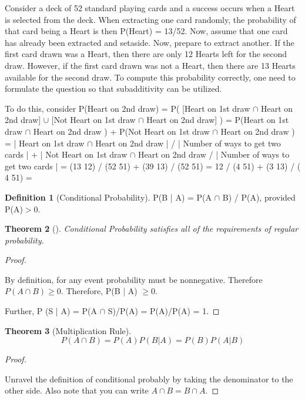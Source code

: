 \documentclass[10pt,]{book}
\theoremstyle{plain}
\newtheorem{theorem}{Theorem}[section]
\theoremstyle{definition}
\newtheorem{definition}[theorem]{Definition}
\theoremstyle{definition}
\theoremstyle{definition}
\numberwithin{equation}{section}
\newcommand{\gt}{ > }
\begin{document}
	Consider a deck of 52 standard playing cards and a success occurs when a Heart is selected from the deck. When extracting one card randomly, the probability	of that card being a Heart is then P(Heart) = 13/52. Now, assume that one card has already been extracted and setaside.  Now, prepare to extract another. If the first card drawn was a Heart, then there are only 12 Hearts left for the second draw. However, if the first card drawn was not a Heart, then there are 13 Hearts available for the second draw. To compute this probability correctly, one need to formulate the question so that subadditivity can  be utilized.%
\par

	To do this, consider 
	P(Heart on 2nd draw) 
	= P( [Heart on 1st draw \(\cap\) Heart on 2nd draw] \(\cup\) [Not Heart on 1st draw \(\cap\) Heart on 2nd draw] )
	= P(Heart on 1st draw \(\cap\) Heart on 2nd draw ) + P(Not Heart on 1st draw \(\cap\) Heart on 2nd draw )
	= | Heart on 1st draw \(\cap\) Heart on 2nd draw | / | Number of ways to get two cards |
	+ | Not Heart on 1st draw \(\cap\) Heart on 2nd draw / | Number of ways to get two cards |
	= (13 12) / (52 51) + (39 13) / (52 51) = 12 / (4 51) + (3 13) / ( 4 51) =  

\begin{definition}[{Conditional Probability}]\label{definition-23}
P(B | A) = P(A \(\cap\) B) / P(A), provided P(A)\(\gt 0\).\end{definition}
\begin{theorem}[{}]\label{theorem-23}
Conditional Probability satisfies all of the requirements of regular probability.\end{theorem}
\begin{proof}\hypertarget{proof-18}{}

		By definition, for any event probability must be nonnegative. Therefore
		\(P(A \cap B) \ge 0\).  Therefore, P(B | A) \(\ge 0\).
\par

		Further, P (S | A) = P(A \(\cap\) S)/P(A) = P(A)/P(A) = 1.
\end{proof}
\begin{theorem}[{Multiplication Rule}]\label{theorem-24}
\begin{equation*}P(A \cap B) = P(A) P(B | A) = P(B) P(A | B)\end{equation*}\end{theorem}
\begin{proof}\hypertarget{proof-19}{}

		Unravel the definition of conditional probably by taking the denominator to the other side. Also note that you can write \(A \cap B = B \cap A\).
\end{proof}
\typeout{************************************************}
\typeout{************************************************}
\end{document}
